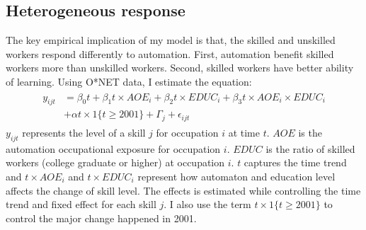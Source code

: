 \documentclass[12pt]{article}
\begin{document}
\subsection{Heterogeneous response}
The key empirical implication of my model is that, the skilled and unskilled workers respond differently to automation. First, automation benefit skilled workers more than unskilled workers. Second, skilled workers have better ability of learning. Using O*NET data, I estimate the equation: 
\begin{align}
\begin{split}
y_{ijt} &= \beta_0 t +\beta_1 t \times AOE_{i} + \beta_2 t \times EDUC_{i} +\beta_3 t \times AOE_{i} \times EDUC_{i} \\
&+ \alpha t \times 1\{t\ge 2001\} +\Gamma_j + \epsilon_{ijt}
\end{split}
\end{align}
$y_{ijt}$ represents the level of a skill $j$ for occupation $i$ at time $t$. $AOE$ is the automation occupational exposure for occupation $i$. $EDUC$ is the ratio of skilled workers (college graduate or higher) at occupation $i$. $t$ captures the time trend and $t\times AOE_{i}$ and $t\times EDUC_{i}$ represent how automaton and education level affects the change of skill level. The effects is estimated while controlling the time trend and fixed effect for each skill $j$. I also use the term $t \times 1\{t\ge 2001\}$ to control the major change happened in 2001. 
\end{document}
